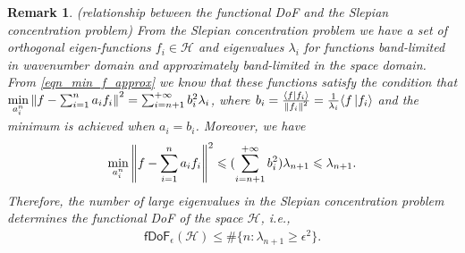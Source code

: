 \documentclass[12pt,draftclsnofoot,journal,onecolumn]{IEEEtran}
\newtheorem{remark}{Remark}
\begin{document}
	\begin{remark}
		\label{remark_fDoF_eigenvalues}
		(relationship between the functional DoF and the Slepian concentration problem) From the Slepian concentration problem we have a set of orthogonal eigen-functions $f_i \in \mathcal{H}$ and eigenvalues $\lambda_i$ for functions band-limited in wavenumber domain and approximately band-limited in the space domain. From \eqref{eqn_min_f_approx} we know that these functions satisfy the condition that $\underset{a_i^n}{\rm min}\left\| f- \sum_{i=1}^n a_i f_i    \right\|^2 = \sum_{i=n+1}^{+\infty}b_i^2 \lambda_i $, where $b_i =\frac{ \langle f \ket{f_i}}{\left\| f_i \right\|^2}= \frac{1}{\lambda_i} \langle f \ket{f_i}$ and the minimum is achieved when $a_i=b_i$. Moreover, we have
		\begin{equation}
			\begin{aligned}
				\underset{a_i^n}{\rm min}\left\| f- \sum_{i=1}^n a_i f_i    \right\|^2	\leqslant (\sum_{i=n+1}^{+\infty}b_i^2) \lambda_{n+1} \leqslant \lambda_{n+1}.
			\end{aligned}
		\end{equation}  
		Therefore, the number of large eigenvalues in the Slepian concentration problem determines the functional DoF of the space $\mathcal{H}$, i.e.,
		\begin{equation}
			\begin{aligned}
				\mathsf{fDoF}_{\epsilon} (\mathcal{H}) \leqslant \#\{n: \lambda_{n+1} \geqslant \epsilon^2\}.
			\end{aligned}
		\end{equation} 
	\end{remark}
\end{document}
